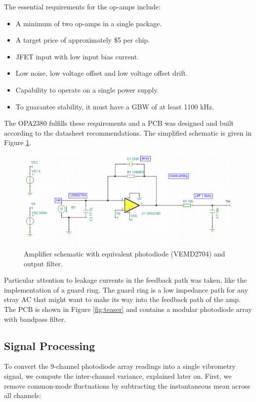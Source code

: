 The essential requirements for the op-amps include:
\begin{itemize}
  \item A minimum of two op-amps in a single package.
  \item A target price of approximately \$5 per chip.
  \item JFET input with low input bias current.
  \item Low noise, low voltage offset and low voltage offset drift.
  \item Capability to operate on a single power supply.
  \item To guarantee stability, it must have a GBW of at least 1100 kHz.
\end{itemize}

The OPA2380 fulfills these requirements and a PCB was designed and built according to the datasheet recommendations. The simplified schematic is given in Figure \ref{fig:spice}.

\begin{figure}[t]
\centering
\includegraphics[width=\widthnarrow]{figures/eval/spice.png}
\caption{Amplifier schematic with equivalent photodiode (VEMD2704) and output filter.}
\label{fig:spice}
\end{figure}
      
Particular attention to leakage currents in the feedback path was taken, like the implementation of a guard ring. The guard ring is a low impedance path for any stray AC that might want to make its way into the feedback path of the amp. The PCB is shown in Figure \ref{fig:teaser} and contains a modular photodiode array with bandpass filter.


\subsection{Signal Processing}
To convert the 9-channel photodiode array readings into a single vibrometry signal, we compute the inter-channel variance, explained later on. 
First, we remove common-mode fluctuations by subtracting the instantaneous mean across all channels:

